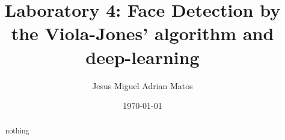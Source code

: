 \documentclass[]{article}
\title{Laboratory 4: Face Detection by the Viola-Jones' algorithm and deep-learning}
\author{Jesus Miguel Adrian Matos}
\date{\today}
\begin{document}
	\maketitle
	
	\begin{abstract}
		\noindent nothing 		
		
		
		
	\end{abstract}
	
	
	
	
	
		
\end{document}

